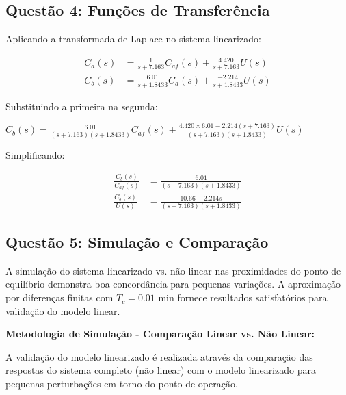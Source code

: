 \documentclass[a4paper,12pt]{article}
\begin{document}
\subsection{Questão 4: Funções de Transferência}

Aplicando a transformada de Laplace no sistema linearizado:

\begin{align}
C_a(s) &= \frac{1}{s + 7.163} C_{af}(s) + \frac{4.420}{s + 7.163} U(s) \\
C_b(s) &= \frac{6.01}{s + 1.8433} C_a(s) + \frac{-2.214}{s + 1.8433} U(s)
\end{align}

Substituindo a primeira na segunda:

$C_b(s) = \frac{6.01}{(s + 7.163)(s + 1.8433)} C_{af}(s) + \frac{4.420 \times 6.01 - 2.214(s + 7.163)}{(s + 7.163)(s + 1.8433)} U(s)$

Simplificando:

\begin{align}
\frac{C_b(s)}{C_{af}(s)} &= \frac{6.01}{(s + 7.163)(s + 1.8433)} \\
\frac{C_b(s)}{U(s)} &= \frac{10.66 - 2.214s}{(s + 7.163)(s + 1.8433)}
\end{align}

\subsection{Questão 5: Simulação e Comparação}

A simulação do sistema linearizado vs. não linear nas proximidades do ponto de equilíbrio demonstra boa concordância para pequenas variações. A aproximação por diferenças finitas com $T_c = 0.01$ min fornece resultados satisfatórios para validação do modelo linear.

\textbf{Metodologia de Simulação - Comparação Linear vs. Não Linear:}

A validação do modelo linearizado é realizada através da comparação das respostas do sistema completo (não linear) com o modelo linearizado para pequenas perturbações em torno do ponto de operação.

\end{document}
